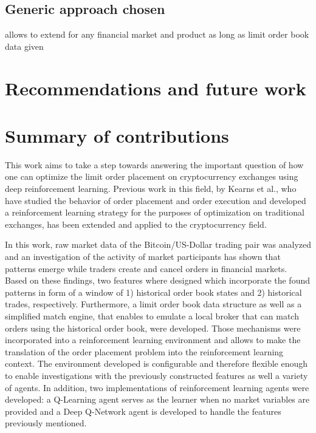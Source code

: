 \subsection{Generic approach chosen}
allows to extend for any financial market and product as long as limit order book data given


\section{Recommendations and future work}

\section{Summary of contributions}

This work aims to take a step towards answering the important question of how one can optimize the limit order placement on cryptocurrency exchanges using deep reinforcement learning.
Previous work in this field, by Kearns et al., who have studied the behavior of order placement and order execution\cite{nevmyvaka2005electronic} and developed a reinforcement learning strategy\cite{nevmyvaka2006reinforcement} for the purposes of optimization on traditional exchanges, has been extended and applied to the cryptocurrency field.

In this work, raw market data of the Bitcoin/US-Dollar trading pair was analyzed and an investigation of the activity of market participants has shown that patterns emerge while traders create and cancel orders in financial markets.
Based on these findings, two features where designed which incorporate the found patterns in form of a window of 1) historical order book states and 2) historical trades, respectively.
Furthermore, a limit order book data structure as well as a simplified match engine, that enables to emulate a local broker that can match orders using the historical order book, were developed.
Those mechanisms were incorporated into a reinforcement learning environment and allows to make the translation of the order placement problem into the reinforcement learning context.
The environment developed is configurable and therefore flexible enough to enable investigations with the previously constructed features as well a variety of agents.
In addition, two implementations of reinforcement learning agents were developed: a Q-Learning agent serves as the learner when no market variables are provided and a Deep Q-Network agent is developed to handle the features previously mentioned.

